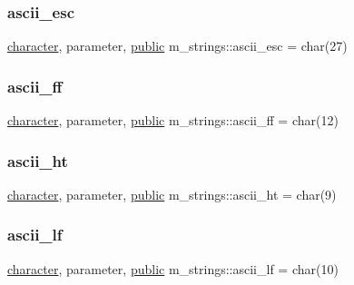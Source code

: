 \subsubsection{\texorpdfstring{ascii\+\_\+esc}{ascii\_esc}}
{\footnotesize\ttfamily \hyperlink{option__stopwatch_83_8txt_abd4b21fbbd175834027b5224bfe97e66}{character}, parameter, \hyperlink{M__stopwatch_83_8txt_a2f74811300c361e53b430611a7d1769f}{public} m\+\_\+strings\+::ascii\+\_\+esc = char(27)}

\mbox{\label{namespacem__strings_a52761941cc3dba4a2ed922d1b7841c90}} 
\subsubsection{\texorpdfstring{ascii\+\_\+ff}{ascii\_ff}}
{\footnotesize\ttfamily \hyperlink{option__stopwatch_83_8txt_abd4b21fbbd175834027b5224bfe97e66}{character}, parameter, \hyperlink{M__stopwatch_83_8txt_a2f74811300c361e53b430611a7d1769f}{public} m\+\_\+strings\+::ascii\+\_\+ff = char(12)}

\mbox{\label{namespacem__strings_a3fef6116790e59c99f48ea31a7b00133}} 
\subsubsection{\texorpdfstring{ascii\+\_\+ht}{ascii\_ht}}
{\footnotesize\ttfamily \hyperlink{option__stopwatch_83_8txt_abd4b21fbbd175834027b5224bfe97e66}{character}, parameter, \hyperlink{M__stopwatch_83_8txt_a2f74811300c361e53b430611a7d1769f}{public} m\+\_\+strings\+::ascii\+\_\+ht = char(9)}

\mbox{\label{namespacem__strings_a4d65d248433f7c6ea3188c558f795c23}} 
\subsubsection{\texorpdfstring{ascii\+\_\+lf}{ascii\_lf}}
{\footnotesize\ttfamily \hyperlink{option__stopwatch_83_8txt_abd4b21fbbd175834027b5224bfe97e66}{character}, parameter, \hyperlink{M__stopwatch_83_8txt_a2f74811300c361e53b430611a7d1769f}{public} m\+\_\+strings\+::ascii\+\_\+lf = char(10)}


